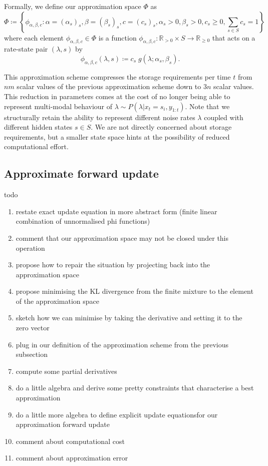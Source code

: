 \documentclass[twoside, 11pt]{article}
\newcommand{\reals}[0] {\mathbb{R}}
\begin{document}
Formally, we define our approximation space $\Phi$ as
\begin{equation}
\Phi \coloneqq \left\{ \phi_{\alpha, \beta, c} : \alpha = (\alpha_s)_s, \beta = (\beta_s)_s, c = (c_s)_s, \alpha_s > 0, \beta_s > 0, c_s \geq 0, \sum_{s \in S} c_s = 1 \right\}
\end{equation}
where each element $\phi_{\alpha, \beta, c} \in \Phi$ is a function $\phi_{\alpha, \beta, c} : \reals_{>0} \times S \rightarrow \reals_{\geq 0}$ that acts on a rate-state pair $(\lambda, s)$ by
\begin{equation}
\phi_{\alpha, \beta, c} (\lambda, s) \coloneqq c_s \; g(\lambda ; \alpha_s, \beta_s) .
\end{equation}

This approximation scheme compresses the storage requirements per time $t$ from $n m$ scalar values of the previous approximation scheme down to $3 n$ scalar values. This reduction in parameters comes at the cost of no longer being able to represent multi-modal behaviour of $\lambda \sim P(\lambda | x_t=s_i, y_{1:t})$. Note that we structurally retain the ability to represent different noise rates $\lambda$ coupled with different hidden states $s \in S$. We are not directly concerned about storage requirements, but a smaller state space hints at the possibility of reduced computational effort.

\subsection{Approximate forward update}

todo
\begin{enumerate}
\item restate exact update equation in more abstract form (finite linear combination of unnormalised phi functions)
\item comment that our approximation space may not be closed under this operation
\item propose how to repair the situation by projecting back into the approximation space
\item propose minimising the KL divergence from the finite mixture to the element of the approximation space
\item sketch how we can minimise by taking the derivative and setting it to the zero vector
\item plug in our definition of the approximation scheme from the previous subsection
\item compute some partial derivatives
\item do a little algebra and derive some pretty constraints that characterise a best approximation
\item do a little more algebra to define explicit update equationsfor our approximation forward update
\item comment about computational cost
\item comment about approximation error
\end{enumerate}


\end{document}
